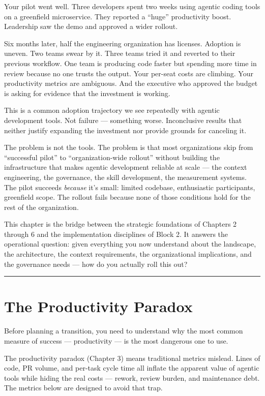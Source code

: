 \documentclass[
  a4paper,
  DIV=11,
  numbers=noendperiod]{scrreprt}
\newcounter{none} %
\begin{document}
Your pilot went well. Three developers spent two weeks using agentic
coding tools on a greenfield microservice. They reported a ``huge''
productivity boost. Leadership saw the demo and approved a wider
rollout.

Six months later, half the engineering organization has licenses.
Adoption is uneven. Two teams swear by it. Three teams tried it and
reverted to their previous workflow. One team is producing code faster
but spending more time in review because no one trusts the output. Your
per-seat costs are climbing. Your productivity metrics are ambiguous.
And the executive who approved the budget is asking for evidence that
the investment is working.

This is a common adoption trajectory we see repeatedly with agentic
development tools. Not failure --- something worse. Inconclusive results
that neither justify expanding the investment nor provide grounds for
canceling it.

The problem is not the tools. The problem is that most organizations
skip from ``successful pilot'' to ``organization-wide rollout'' without
building the infrastructure that makes agentic development reliable at
scale --- the context engineering, the governance, the skill
development, the measurement systems. The pilot succeeds \emph{because}
it's small: limited codebase, enthusiastic participants, greenfield
scope. The rollout fails because none of those conditions hold for the
rest of the organization.

This chapter is the bridge between the strategic foundations of Chapters
2 through 6 and the implementation disciplines of Block 2. It answers
the operational question: given everything you now understand about the
landscape, the architecture, the context requirements, the
organizational implications, and the governance needs --- how do you
actually roll this out?

\begin{center}\rule{0.5\linewidth}{0.5pt}\end{center}

\section{The Productivity Paradox}\label{the-productivity-paradox-1}

Before planning a transition, you need to understand why the most common
measure of success --- productivity --- is the most dangerous one to
use.

The productivity paradox (Chapter 3) means traditional metrics mislead.
Lines of code, PR volume, and per-task cycle time all inflate the
apparent value of agentic tools while hiding the real costs --- rework,
review burden, and maintenance debt. The metrics below are designed to
avoid that trap.
\end{document}
